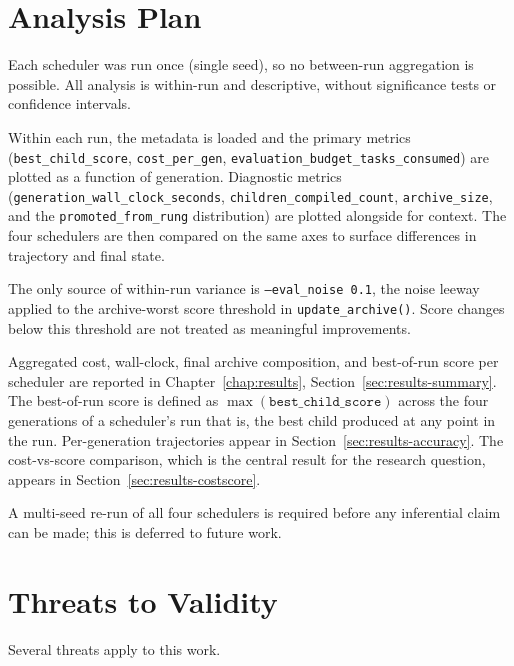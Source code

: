 \section{Analysis Plan}
\label{sec:analysis}

Each scheduler was run once (single seed), so no between-run
aggregation is possible. All analysis is within-run and descriptive,
without significance tests or confidence intervals.

Within each run, the metadata is loaded and the primary metrics
(\texttt{best\bk\_child\bk\_score}, \texttt{cost\bk\_per\bk\_gen},
\texttt{evaluation\bk\_budget\bk\_tasks\bk\_consumed}) are plotted as
a function of generation. Diagnostic metrics
(\texttt{generation\bk\_wall\bk\_clock\bk\_seconds},
\texttt{children\bk\_compiled\bk\_count}, \texttt{archive\bk\_size},
and the \texttt{promoted\bk\_from\bk\_rung} distribution) are plotted
alongside for context. The four schedulers are then compared on the
same axes to
surface differences in trajectory and final state.

The only source of within-run variance is \texttt{--eval\_noise 0.1},
the noise leeway applied to the archive-worst score threshold in
\texttt{update\_archive()}. Score changes below this threshold are not
treated as meaningful improvements.

Aggregated cost, wall-clock, final archive composition, and
best-of-run score per scheduler are reported in
Chapter~\ref{chap:results}, Section~\ref{sec:results-summary}. The best-of-run score is
defined as $\max(\texttt{best\_child\_score})$ across the four
generations of a scheduler's run that is, the best child produced
at any point in the run. Per-generation
trajectories appear in Section~\ref{sec:results-accuracy}. The
cost-vs-score comparison, which is the central result for the research
question, appears in Section~\ref{sec:results-costscore}.

A multi-seed re-run of all four schedulers is required before any
inferential claim can be made; this is deferred to future work.

\section{Threats to Validity}
\label{sec:threats}

Several threats apply to this work.


